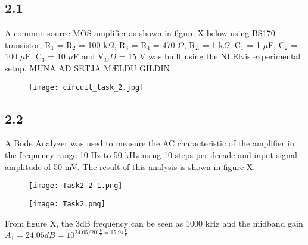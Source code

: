\subsection*{2.1}
A common-source MOS amplifier as shown in figure X below using BS170 transistor, R$_1$ = R$_2$ = 100 k$\Omega$, R$_3$ = R$_4$ = 470 $\Omega$, R$_L$ = 1 k$\Omega$, C$_1$ = 1 $\mu$F, C$_2$ = 100 $\mu$F, C$_3$ = 10 $\mu$F and V$_DD$ = 15 V was built using the NI Elvis experimental setup. MUNA AÐ SETJA MÆLDU GILDIN

    \begin{figure}[h!]
        \centering
        \texttt{[image: circuit\_task\_2.jpg]}
    \end{figure}



\subsection*{2.2}


A Bode Analyzer was used to measure the AC characteristic of the amplifier in the frequency range 10 Hz to 50 kHz using 10 steps per decade and input signal amplitude of 50 mV. The result of this analysis is shown in figure X.

    \begin{figure}[h!]
        \centering
        \texttt{[image: Task2-2-1.png]}
    \end{figure}

    \begin{figure}[h!]
        \centering
        \texttt{[image: Task2.png]}
    \end{figure}

From figure X, the 3dB frequency can be seen as 1000 kHz and the midband gain $A_1 = 24.05 dB = 10^{24.05/20) \frac{V}{V} = 15.94 \frac{V}{V}}$


